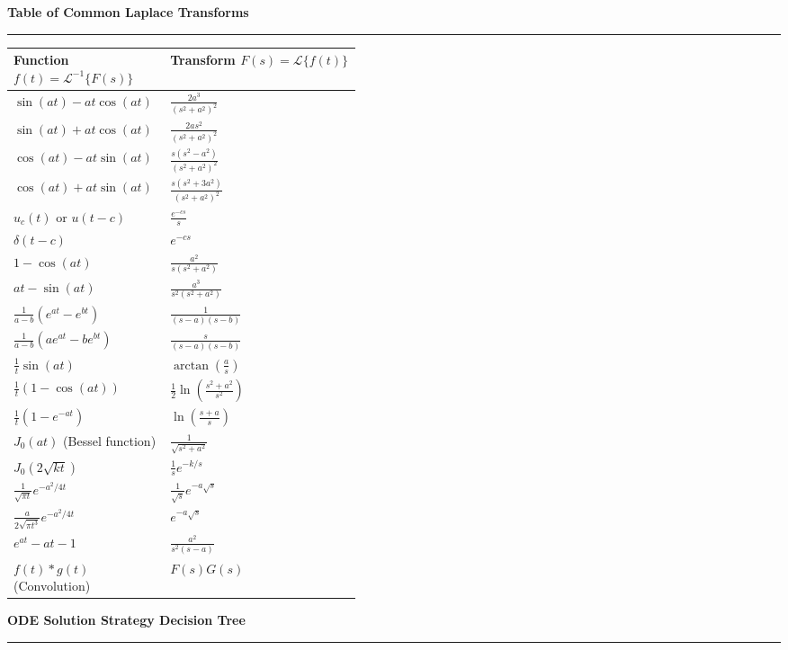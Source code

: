 \documentclass[10pt, landscape, twocolumn]{article}
\newcommand{\cheatsheetsection}[1]{
    \vspace{0.6em}
    {\color{themeblue}\large\bfseries #1} \par
    \vspace{-0.5em}
    {\color{themeblue}\rule{\linewidth}{1pt}} \par
    \vspace{0.2em}
}
\begin{document}
\newpage

\cheatsheetsection{Table of Common Laplace Transforms}
\vspace{0.5em}

\begin{tabularx}{\linewidth}{|p{0.45\linewidth}|X|}
\hline
\textbf{Function $f(t) = \mathcal{L}^{-1}\{F(s)\}$} & \textbf{Transform $F(s) = \mathcal{L}\{f(t)\}$} \\ \hline
$\sin(at) - at \cos(at)$ & $\frac{2a^3}{(s^2+a^2)^2}$ \\ \hline
$\sin(at) + at \cos(at)$ & $\frac{2as^2}{(s^2+a^2)^2}$ \\ \hline
$\cos(at) - at \sin(at)$ & $\frac{s(s^2-a^2)}{(s^2+a^2)^2}$ \\ \hline
$\cos(at) + at \sin(at)$ & $\frac{s(s^2+3a^2)}{(s^2+a^2)^2}$ \\ \hline
$u_c(t)$ or $u(t-c)$ & $\frac{e^{-cs}}{s}$ \\ \hline
$\delta(t-c)$ & $e^{-cs}$ \\ \hline
$1 - \cos(at)$ & $\frac{a^2}{s(s^2+a^2)}$ \\ \hline
$at - \sin(at)$ & $\frac{a^3}{s^2(s^2+a^2)}$ \\ \hline
$\frac{1}{a-b}(e^{at} - e^{bt})$ & $\frac{1}{(s-a)(s-b)}$ \\ \hline
$\frac{1}{a-b}(a e^{at} - b e^{bt})$ & $\frac{s}{(s-a)(s-b)}$ \\ \hline
$\frac{1}{t}\sin(at)$ & $\arctan\left(\frac{a}{s}\right)$ \\ \hline
$\frac{1}{t}(1 - \cos(at))$ & $\frac{1}{2}\ln\left(\frac{s^2+a^2}{s^2}\right)$ \\ \hline
$\frac{1}{t}(1 - e^{-at})$ & $\ln\left(\frac{s+a}{s}\right)$ \\ \hline
$J_0(at)$ (Bessel function) & $\frac{1}{\sqrt{s^2+a^2}}$ \\ \hline
$J_0(2\sqrt{kt})$ & $\frac{1}{s}e^{-k/s}$ \\ \hline
$\frac{1}{\sqrt{\pi t}}e^{-a^2/4t}$ & $\frac{1}{\sqrt{s}}e^{-a\sqrt{s}}$ \\ \hline
$\frac{a}{2\sqrt{\pi t^3}}e^{-a^2/4t}$ & $e^{-a\sqrt{s}}$ \\ \hline
$e^{at} - at - 1$ & $\frac{a^2}{s^2(s-a)}$ \\ \hline
$f(t) * g(t)$ (Convolution) & $F(s)G(s)$ \\ \hline
\end{tabularx}
\endgroup

\clearpage
\onecolumn

\cheatsheetsection{ODE Solution Strategy Decision Tree}
\vspace{1em}
\end{document}
